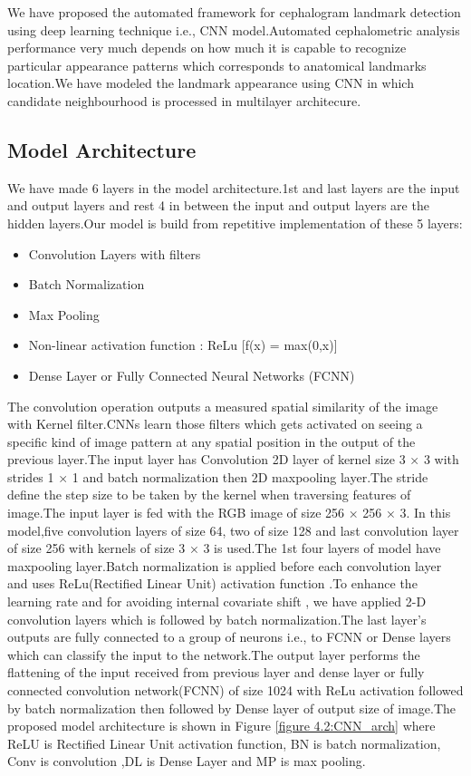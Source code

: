 \documentclass[sn-mathphys]{sn-jnl}%
\theoremstyle{thmstyleone}%
\theoremstyle{thmstyletwo}%
\theoremstyle{thmstylethree}%
\begin{document}
\par We have proposed the automated  framework for cephalogram landmark detection using deep learning technique i.e., CNN model.Automated cephalometric analysis performance very much depends on how much it is capable to recognize particular appearance patterns which corresponds to anatomical landmarks location.We have modeled the landmark appearance using CNN in which candidate neighbourhood is processed in multilayer architecure.

\subsection{Model Architecture}
 We have made 6 layers in the model architecture.1st and last layers are the input and output layers and rest 4 in between the input and output layers are the hidden layers.Our model is build from repetitive implementation of these 5 layers:
 
 \begin{itemize}
     \item Convolution Layers with filters
     \item Batch Normalization
     \item Max Pooling
     \item Non-linear activation function : ReLu [f(x) = max(0,x)]
     \item Dense Layer or Fully Connected Neural Networks (FCNN)
 \end{itemize}
 
 \par The convolution operation outputs a measured spatial similarity of the  image with Kernel filter.CNNs learn those filters which gets activated on seeing a specific kind of image pattern at any spatial position in the output of the previous layer.The input layer has Convolution 2D layer of kernel size 3 × 3 with strides 1 × 1 and batch normalization then 2D maxpooling layer.The stride define the step size to be taken by the kernel when traversing features of image.The input layer is fed with the RGB image of size 256 × 256 × 3. In this model,five convolution layers of size 64, two of size 128 and last convolution layer of size 256 with kernels of size 3 × 3 is used.The 1st four layers of model have maxpooling layer.Batch normalization is applied before each convolution layer and  uses ReLu(Rectified Linear Unit) activation function .To enhance the learning rate and for avoiding internal covariate shift ,  we have applied 2-D convolution layers which is followed by batch normalization.The last layer's outputs are fully connected to a group of neurons i.e., to FCNN or Dense layers which can classify the input to the network.The output layer performs the flattening of the input received from previous layer and dense layer or fully connected convolution network(FCNN) of size 1024 with ReLu activation followed by batch normalization then followed by Dense layer of output size of image.The proposed model architecture is shown in Figure \ref{figure 4.2:CNN_arch} where  ReLU is Rectified Linear Unit activation function, BN is batch normalization, Conv is convolution ,DL is Dense Layer and MP is max pooling.
\end{document}

